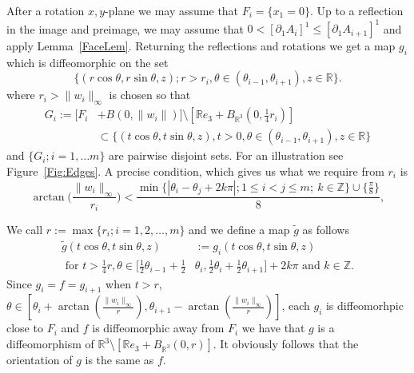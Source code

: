 \documentclass[12pt,a4paper]{amsart}
\theoremstyle{plain}
\theoremstyle{definition}
\numberwithin{equation}{section}
\def\er{\mathbb R}
\begin{document}
	After a rotation $x,y$-plane  we may assume that $F_i = \{x_1 = 0\}$. Up to a reflection in  the image and preimage, we may assume that $0<[\partial_1A_i]^1\leq [\partial_1A_{i+1}]^1$ and apply Lemma~\ref{FaceLem}. Returning the reflections and rotations we get a map $g_{i}$ which is diffeomorphic on the set
	$$
		\{(r\cos\theta, r\sin\theta, z); r>r_i, \theta\in (\theta_{i-1},\theta_{i+1}), z\in \er\}.
	$$
	where $r_i>\|w_i\|_{\infty}$ is chosen so that
	$$
		\begin{aligned}
			G_i:=[F_i&+B(0,\|w_i\|)]\setminus [\er e_3+ B_{\er^3}(0,\tfrac{1}{4}r_i)]\\
			&\subset \{(t\cos\theta,t\sin\theta,z), t>0, \theta\in (\theta_{i-1}, \theta_{i+1}), z\in \er\}
		\end{aligned}
	$$
	and $\{G_i; i=1,\dots m\}$ are pairwise disjoint sets. For an illustration see Figure~\ref{Fig:Edges}. A precise condition, which gives us what we require from $r_i$ is
	\begin{equation}\label{SmallForUseOfEdges}
		\arctan\Big(\frac{\|w_i\|_{\infty}}{r_i}\Big)< \frac{\min\{|\theta_i - \theta_j + 2k\pi|; 1\leq i<j\leq m; \ k\in\mathbb{Z} \} \cup \{\tfrac{\pi}{8}\}}{8},
	\end{equation} 
	
	We call $r:=\max\{r_i; i=1,2,\dots, m\}$ and we define a map $\tilde{g}$ as follows
	\begin{equation}\label{CallMeGee}
	\begin{aligned}
		\tilde{g}(t\cos\theta, t\sin\theta,z)&:= g_i(t\cos\theta, t\sin\theta,z) \\
		\text{ for } t>\tfrac{1}{4}r, \theta \in [\tfrac{1}{2}\theta_{i-1}+ \tfrac{1}{2}&\theta_i,\tfrac{1}{2}\theta_{i}+ \tfrac{1}{2}\theta_{i+1}]+2k\pi \text{ and } k\in\mathbb{Z}. 
	\end{aligned}
	\end{equation}
	Since $g_i = f = g_{i+1}$ when $t>r$, $\theta\in [\theta_i +\arctan(\frac{\|w_i\|_{\infty}}{r}), \theta_{i+1} - \arctan(\frac{\|w_i\|_{\infty}}{r})]$, each $g_i$ is diffeomorhpic close to $F_i$ and $f$ is diffeomorphic away from $F_i$ we have that $g$ is a diffeomorphism of $\er^3\setminus [\er e_3 +B_{\er^3}(0,r)]$. It obviously follows that the orientation of $g$ is the same as $f$.
	
\end{document}
